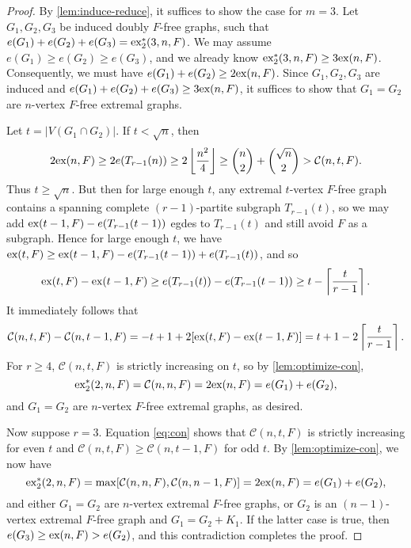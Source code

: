 \documentclass[10pt, reqno]{report}
\newcommand*{\ex}{\textnormal{ex}}
\newcommand*{\dex}{\textnormal{ex}_2}
\newcommand*{\con}{\mathcal{C}}
\begin{document}
\begin{proof}
  By \cref{lem:induce-reduce}, it suffices to show the case for $m = 3$. Let $G_1, G_2, G_3$ be induced doubly $F$-free graphs, such that $e(G_1) + e(G_2) + e(G_3) = \dex^*(3, n, F)$. We may assume $e(G_1) \geq e(G_2) \geq e(G_3)$, and we already know $\dex^*(3, n, F) \geq 3\ex(n, F)$. Consequently, we must have $e(G_1) + e(G_2) \geq 2\ex(n, F)$. Since $G_1, G_2, G_3$ are induced and $e(G_1) + e(G_2) + e(G_3) \geq 3\ex(n, F)$, it suffices to show that $G_1 = G_2$ are $n$-vertex $F$-free extremal graphs.
  
  Let $t = |V(G_1 \cap G_2)|$. If $t < \sqrt{n}$, then
  \[
    2\ex(n, F) \geq 2e(T_{r - 1}(n)) \geq 2\left\lfloor\frac{n^2}{4}\right\rfloor \geq \binom{n}{2} + \binom{\sqrt{n}}{2} > \con(n, t, F).
  \]
  Thus $t \geq \sqrt{n}$. But then for large enough $t$, any extremal $t$-vertex $F$-free graph contains a spanning complete $(r - 1)$-partite subgraph $T_{r - 1}(t)$, so we may add $\ex(t - 1, F) - e(T_{r - 1}(t - 1))$ egdes to $T_{r - 1}(t)$ and still avoid $F$ as a subgraph. Hence for large enough $t$, we have $\ex(t, F) \geq \ex(t - 1, F) - e(T_{r - 1}(t - 1)) + e(T_{r - 1}(t))$, and so
  \[
    \ex(t, F) - \ex(t - 1, F) \geq e(T_{r - 1}(t)) - e(T_{r - 1}(t - 1)) \geq t - \left\lceil \frac{t}{r - 1} \right\rceil.
  \]
  It immediately follows that
  \begin{equation}
    \con(n, t, F) - \con(n, t - 1, F) = - t + 1 + 2[\ex(t, F) - \ex(t - 1, F)] = t + 1 - 2\left\lceil \frac{t}{r - 1} \right\rceil. \label{eq:con}
  \end{equation}
  For $r \geq 4$, $\con(n, t, F)$ is strictly increasing on $t$, so by \cref{lem:optimize-con}, 
  \[
    \dex^*(2, n, F) = \con(n, n, F) = 2\ex(n, F) = e(G_1) + e(G_2),
  \] 
  and $G_1 = G_2$ are $n$-vertex $F$-free extremal graphs, as desired. 
  
  Now suppose $r = 3$. Equation \eqref{eq:con} shows that $\con(n, t, F)$ is strictly increasing for even $t$ and $\con(n, t, F) \geq \con(n, t - 1, F)$ for odd $t$. By \cref{lem:optimize-con}, we now have 
  \[
    \dex^*(2, n, F) = \max[\con(n, n, F), \con(n, n - 1, F)] = 2\ex(n, F) = e(G_1) + e(G_2),
  \]
  and either $G_1 = G_2$ are $n$-vertex extremal $F$-free graphs, or $G_2$ is an $(n - 1)$-vertex extremal $F$-free graph and $G_1 = G_2 + K_1$. If the latter case is true, then $e(G_3) \geq \ex(n, F) > e(G_2)$, and this contradiction completes the proof.
\end{proof}

\end{document}
